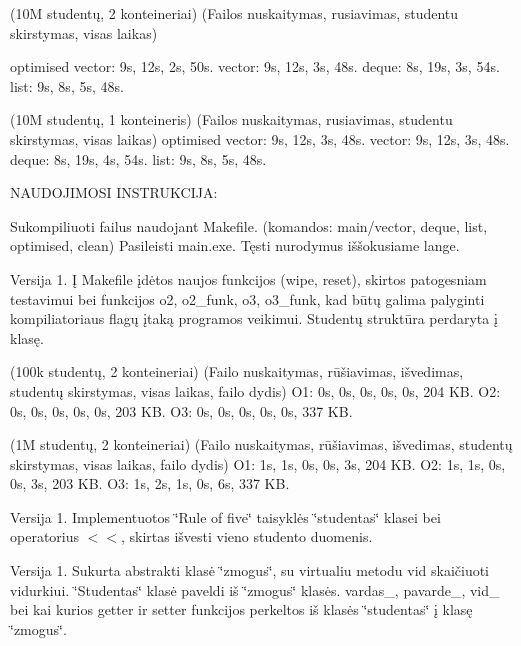 (10M studentų, 2 konteineriai) (Failos nuskaitymas, rusiavimas, studentu skirstymas, visas laikas)

optimised vector\+: 9s, 12s, 2s, 50s. vector\+: 9s, 12s, 3s, 48s. deque\+: 8s, 19s, 3s, 54s. list\+: 9s, 8s, 5s, 48s.

(10M studentų, 1 konteineris) (Failos nuskaitymas, rusiavimas, studentu skirstymas, visas laikas) optimised vector\+: 9s, 12s, 3s, 48s. vector\+: 9s, 12s, 3s, 48s. deque\+: 8s, 19s, 4s, 54s. list\+: 9s, 8s, 5s, 48s.

NAUDOJIMOSI INSTRUKCIJA\+:

Sukompiliuoti failus naudojant Makefile. (komandos\+: main/vector, deque, list, optimised, clean) Pasileisti main.\+exe. Tęsti nurodymus iššokusiame lange.

Versija 1. Į Makefile įdėtos naujos funkcijos (wipe, reset), skirtos patogesniam testavimui bei funkcijos o2, o2\+\_\+funk, o3, o3\+\_\+funk, kad būtų galima palyginti kompiliatoriaus flag\textquotesingle{}ų įtaką programos veikimui. Studentų struktūra perdaryta į klasę.

(100k studentų, 2 konteineriai) (Failo nuskaitymas, rūšiavimas, išvedimas, studentų skirstymas, visas laikas, failo dydis) O1\+: 0s, 0s, 0s, 0s, 0s, 204 KB. O2\+: 0s, 0s, 0s, 0s, 0s, 203 KB. O3\+: 0s, 0s, 0s, 0s, 0s, 337 KB.

(1M studentų, 2 konteineriai) (Failo nuskaitymas, rūšiavimas, išvedimas, studentų skirstymas, visas laikas, failo dydis) O1\+: 1s, 1s, 0s, 0s, 3s, 204 KB. O2\+: 1s, 1s, 0s, 0s, 3s, 203 KB. O3\+: 1s, 2s, 1s, 0s, 6s, 337 KB.

Versija 1. Implementuotos \char`\"{}\+Rule of five\char`\"{} taisyklės \char`\"{}studentas\char`\"{} klasei bei operatorius \texorpdfstring{$<$}{<}\texorpdfstring{$<$}{<}, skirtas išvesti vieno studento duomenis.

Versija 1. Sukurta abstrakti klasė \char`\"{}zmogus\char`\"{}, su virtualiu metodu vid skaičiuoti vidurkiui. \char`\"{}\+Studentas\char`\"{} klasė paveldi iš \char`\"{}zmogus\char`\"{} klasės. vardas\+\_\+, pavarde\+\_\+, vid\+\_\+ bei kai kurios getter ir setter funkcijos perkeltos iš klasės \char`\"{}studentas\char`\"{} į klasę \char`\"{}zmogus\char`\"{}. 